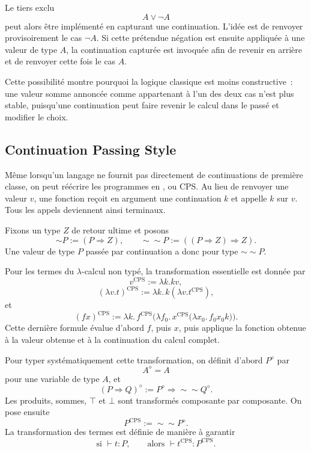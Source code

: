 \thingy Le tiers exclu
\[
A\lor\neg A
\]
peut alors être implémenté en capturant une continuation. L'idée est de
renvoyer provisoirement le cas $\neg A$. Si cette prétendue négation
est ensuite appliquée à une valeur de type $A$, la continuation
capturée est invoquée afin de revenir en arrière et de renvoyer cette
fois le cas $A$.

Cette possibilité montre pourquoi la logique classique est moins
constructive : une valeur somme annoncée comme appartenant à l'un des
deux cas n'est plus stable, puisqu'une continuation peut faire revenir
le calcul dans le passé et modifier le choix.

\subsection{Continuation Passing Style}

\thingy Même lorsqu'un langage ne fournit pas directement de
continuations de première classe, on peut réécrire les programmes en
, ou CPS. Au lieu de renvoyer une
valeur $v$, une fonction reçoit en argument une continuation $k$ et
appelle $k$ sur $v$. Tous les appels deviennent ainsi terminaux.

Fixons un type $Z$ de retour ultime et posons
\[
\mathop{\sim}P:=(P\Rightarrow Z),
\qquad
\mathop{\sim}\mathop{\sim}P
  :=((P\Rightarrow Z)\Rightarrow Z).
\]
Une valeur de type $P$ passée par continuation a donc pour type
$\mathop{\sim}\mathop{\sim}P$.

Pour les termes du $\lambda$-calcul non typé, la transformation
essentielle est donnée par
\[
v^{\mathrm{CPS}}:=\lambda k.kv,
\]
\[
(\lambda v.t)^{\mathrm{CPS}}
 :=\lambda k.\,k(\lambda v.t^{\mathrm{CPS}}),
\]
et
\[
(fx)^{\mathrm{CPS}}
 :=\lambda k.\,
 f^{\mathrm{CPS}}
 \bigl(\lambda f_0.\,
 x^{\mathrm{CPS}}
 \bigl(\lambda x_0.\,f_0x_0k\bigr)\bigr).
\]
Cette dernière formule évalue d'abord $f$, puis $x$, puis applique la
fonction obtenue à la valeur obtenue et à la continuation du calcul
complet.

\thingy Pour typer systématiquement cette transformation, on définit
d'abord $P^\diamond$ par
\[
A^\diamond=A
\]
pour une variable de type $A$, et
\[
(P\Rightarrow Q)^\diamond
 :=P^\diamond\Rightarrow
   \mathop{\sim}\mathop{\sim}Q^\diamond.
\]
Les produits, sommes, $\top$ et $\bot$ sont transformés composante par
composante. On pose ensuite
\[
P^{\mathrm{CPS}}
 :=\mathop{\sim}\mathop{\sim}P^\diamond.
\]
La transformation des termes est définie de manière à garantir
\[
\text{si }\vdash t:P,
\qquad
\text{alors }\vdash t^{\mathrm{CPS}}:P^{\mathrm{CPS}}.
\]

